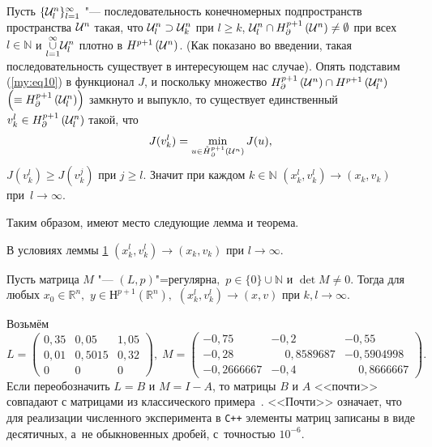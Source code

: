 \smallskip
Пусть  $\{{\cal U}^{n}_{l} \}^{\infty}_{l=1}$  "--- последовательность конечномерных подпространств
пространства  ${\cal U}^{n}$ такая, что  ${\cal U}^{n}_{l} \supset {\cal U}^{n}_{k} $ при  $l\geq k$,
${\cal U}^{n}_{l} \cap {H^{p+1}_{\partial}}\left({\cal U}^{n} \right) \neq \emptyset$ при всех $l\in{\mathbb N}$
и $\underset{l=1}{\overset{\infty}{\cup}}{\cal U}^{n}_{l} $ плотно в $H^{p+1} \left({\cal U}^{n} \right)$. 
(Как показано во введении, такая последовательность существует в интересующем нас случае). 
Опять подставим (\ref{my:eq10}) в функционал $J$, и поскольку множество
${H^{p+1}_{\partial}}\left({\cal U}^{n} \right) \cap {H^{p+1}}\left({\cal U}^{n}_{l} \right)$
$ \left( \equiv {H^{p+1}_{\partial}}\left({\cal U}^{n}_{l} \right) \right)$  замкнуто и выпукло, то существует
единственный  $v^{l}_{k} \in {H^{p+1}_{\partial}}\left({\cal U}^{n}_{l} \right) $ такой, что
\begin{equation*}
J(v^{l}_{k})=\min\limits_{u\in\mathring{H}{}^{p+1}_{\partial}\left({\cal U}^{n} \right)} J(u),
\end{equation*}
$J(v^{l}_{k}) \geq J(v^{j}_{k})$ при $j\geq l$. Значит при каждом $k \in {\mathbb N}$ $(x^{l}_{k}, v^{l}_{k})
 \rightarrow (x_{k},v_{k})$ при~\mbox{$l \rightarrow\infty$.}

Таким образом, имеют место следующие лемма и теорема.

\smallskip

\begin{lemma}[2]В условиях леммы {\rm \hyperlink{svir:lemma:1}{1}} $ (x^{l}_{k}, v^{l}_{k}) \rightarrow (x_{k},v_{k})$ при $l \rightarrow\infty$.
\end{lemma}
\smallskip
\begin{theorem}[4]Пусть матрица $M$ "--- $(L,p)$"=регулярна$,$ $p\in\{0\}\cup{\mathbb N}$ и \mbox{$\det M\neq 0.$}
 Тогда для любых $x_{0}\in{\mathbb R}^{n},$  $y \in Н^{p+1} \left( {\mathbb R}^{n} \right),$
$ (x^{l}_{k}, v^{l}_{k}) \rightarrow (x,v)$ при $k,  l \rightarrow\infty.$
\end{theorem}
\smallskip
{} Возьмём
\begin{equation*}
L=\left(\!\!
\begin{array}{lll}
    0,35 & 0,05 & 1,05 \\
     0,01 & 0,5015 & 0,32 \\
      0 & 0 & 0
\end{array}\!\!\right), \; M=\left(\!\!\begin{array}{lll}
    -0,75 & -0,2 & -0,55 \\
     -0,28 & \phantom{-}0,8589687 & -0,5904998 \\
      -0,2666667 & -0,4 & \phantom{-}0,8666667
\end{array}\!\!\right).
\end{equation*}
Если переобозначить $L=B$ и $M=I-A$, то матрицы $B$ и $A$ <<почти>> совпадают с матрицами из классического примера~\cite{Leo}.
<<Почти>> означает, что для реализации численного эксперимента в {\tt C++} элементы матриц записаны в виде десятичных,
а~не обыкновенных дробей, с~точностью $10^{-6}$.

